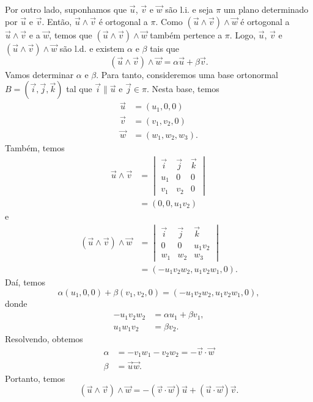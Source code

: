 Por outro lado, suponhamos que $\vec{u}$, $\vec{v}$ e $\vec{w}$ são l.i. e seja $\pi$ um plano determinado por $\vec{u}$ e $\vec{v}$. Então, $\vec{u}\land\vec{v}$ é ortogonal a $\pi$. Como $(\vec{u}\land\vec{v})\land\vec{w}$ é ortogonal a $\vec{u}\land\vec{v}$ e a $\vec{w}$, temos que $(\vec{u}\land\vec{v})\land\vec{w}$ também pertence a $\pi$. Logo, $\vec{u}$, $\vec{v}$ e $(\vec{u}\land\vec{v})\land\vec{w}$ são l.d. e existem $\alpha$ e $\beta$ tais que
\begin{equation}
  (\vec{u}\land\vec{v})\land\vec{w} = \alpha\vec{u} + \beta\vec{v}.
\end{equation}
Vamos determinar $\alpha$ e $\beta$. Para tanto, consideremos uma base ortonormal $B = (\vec{i}, \vec{j}, \vec{k})$ tal que $\vec{i}\parallel\vec{u}$ e $\vec{j}\in\pi$. Nesta base, temos
\begin{align}
  \vec{u} &= (u_1,0,0)\\
  \vec{v} &= (v_1,v_2,0)\\
  \vec{w} &= (w_1,w_2,w_3).
\end{align}
Também, temos
\begin{align}
  \vec{u}\land\vec{v} &=
  \begin{vmatrix}
    \vec{i} & \vec{j} & \vec{k} \\
    u_1 & 0 & 0 \\
    v_1 & v_2 & 0
  \end{vmatrix} \\
  &= (0,0,u_1v_2)
\end{align}
e
\begin{align}
  (\vec{u}\land\vec{v})\land\vec{w} &=
                                      \begin{vmatrix}
                                        \vec{i} & \vec{j} & \vec{k} \\
                                        0 & 0 & u_1v_2 \\
                                        w_1 & w_2 & w_3
                                      \end{vmatrix}\\
                                    &= (-u_1v_2w_2,u_1v_2w_1,0).
\end{align}
Daí, temos
\begin{equation}
  \alpha(u_1,0,0)+\beta(v_1,v_2,0) = (-u_1v_2w_2,u_1v_2w_1,0),
\end{equation}
donde
\begin{align}
  -u_1v_2w_2 &= \alpha u_1+\beta v_1,\\
   u_1w_1v_2 &= \beta v_2.  
\end{align}
Resolvendo, obtemos
\begin{align}
  \alpha &= -v_1w_1-v_2w_2 = -\vec{v}\cdot\vec{w}\\
  \beta &= \vec{u}\vec{w}.
\end{align}
Portanto, temos
\begin{equation}
  (\vec{u}\land\vec{v})\land\vec{w} = -(\vec{v}\cdot\vec{w})\vec{u}+(\vec{u}\cdot\vec{w})\vec{v}.
\end{equation}

